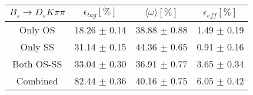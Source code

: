 \begin{tabular}{c c c c}
\hline
\hline
$ B_s \to D_s K \pi \pi$ & $\epsilon_{tag} [\%]$ & $\langle \omega \rangle [\%] $ & $\epsilon_{eff} [\%]$ \\
\hline
Only OS & 18.26 $\pm$ 0.14 & 38.88 $\pm$ 0.88 & 1.49 $\pm$ 0.19\\
Only SS & 31.14 $\pm$ 0.15 & 44.36 $\pm$ 0.65 & 0.91 $\pm$ 0.16\\
Both OS-SS & 33.04 $\pm$ 0.30 & 36.91 $\pm$ 0.77 & 3.65 $\pm$ 0.34\\
\hline
Combined & 82.44 $\pm$ 0.36 & 40.16 $\pm$ 0.75 & 6.05 $\pm$ 0.42\\
\hline
\hline
\end{tabular}
